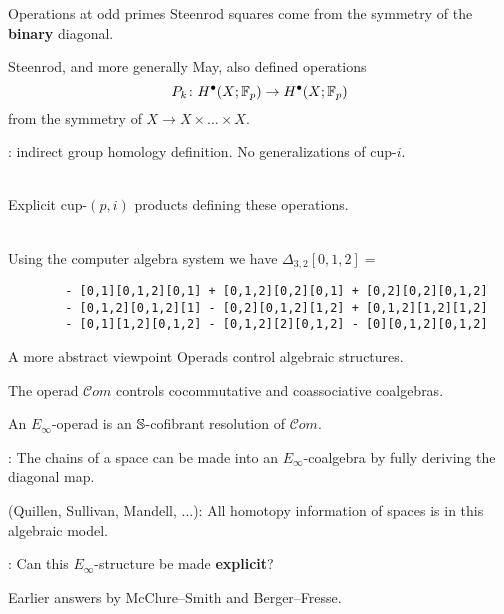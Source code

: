 
\begin{frame}[fragile]{Operations at odd primes}
	\pause
	Steenrod squares come from the symmetry of the \textbf{binary} diagonal.

	\medskip\pause
	Steenrod, and more generally May, also defined operations
	\[
	P_k \colon H^\bullet(X; {\mathbb{F}_p}) \to H^\bullet(X; {\mathbb{F}_p})
	\]
	from the symmetry of $X \to X \times \dots \times X$.

	\medskip\pause
	: indirect group homology definition.
	No generalizations of cup-$i$.

	\bigskip\pause
	 \\
	Explicit cup-$(p,i)$ products defining these operations.

	\medskip\pause
	 \\
	Using the computer algebra system  we have $\Delta_{3,2}[0,1,2] = $

	\begin{verbatim}
		- [0,1][0,1,2][0,1] + [0,1,2][0,2][0,1] + [0,2][0,2][0,1,2]
		- [0,1,2][0,1,2][1] - [0,2][0,1,2][1,2] + [0,1,2][1,2][1,2]
		- [0,1][1,2][0,1,2] - [0,1,2][2][0,1,2] - [0][0,1,2][0,1,2]
	\end{verbatim}
\end{frame}

\begin{frame}{A more abstract viewpoint}
	\pause
	Operads control algebraic structures.

	\bigskip\pause
	The operad $\mathcal{C}om$ controls cocommutative and coassociative coalgebras.

	\bigskip\pause
	An $E_\infty$-operad is an $\mathbb{S}$-cofibrant resolution of $\mathcal{C}om$.


	\bigskip\pause
	:
	The chains of a space can be made into an $E_\infty$-coalgebra by fully deriving the diagonal map.

	\bigskip\pause
	 (Quillen, Sullivan, Mandell, ...): All homotopy information of spaces is in this algebraic model.

	\bigskip\pause
	: Can this $E_\infty$-structure be made \textbf{explicit}?

	\bigskip\pause
	Earlier answers by McClure--Smith and Berger--Fresse.
\end{frame}

